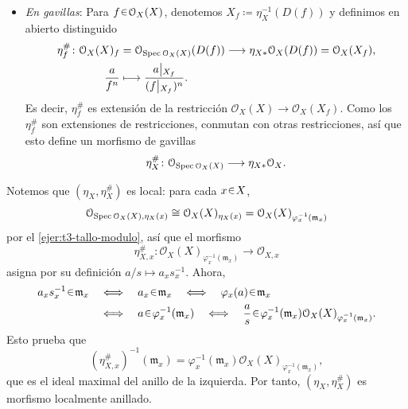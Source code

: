 \begin{sol}
\begin{itemize}
\item \emph{En gavillas}: Para $f\en\mathcal O_X(X)$, denotemos $X_f\coloneq\eta_X^{-1}(D(f))$ y definimos en abierto distinguido
\[
\begin{aligned}
\eta_f^\#\colon\mathcal O_X(X)_f
&=\mathcal O_{\Spec\mathcal O_X(X)}(D(f))
\longrightarrow\eta_{X*}\mathcal O_X(D(f))=\mathcal O_X(X_f),\\
\frac{a}{f^n}&\longmapsto\frac{\restr{a}{X_f}}{(\restr{f}{X_f})^n}.
\end{aligned}
\]
Es decir, $\eta_f^\#$ es extensión de la restricción $\mathcal O_X(X)\to\mathcal O_X(X_f)$. Como los $\eta_f^\#$ son extensiones de restricciones, conmutan con otras restricciones, así que esto define un morfismo de gavillas
\[
\eta_X^\#\colon\mathcal O_{\operatorname{Spec}\mathcal O_X(X)}\longrightarrow\eta_{X*}\mathcal O_X.
\]
\end{itemize}
Notemos que $(\eta_X,\eta_X^\#)$ es local: para cada $x\en X$,
\[
\mathcal O_{\operatorname{Spec}\mathcal O_X(X),\eta_X(x)}
\cong\mathcal O_X(X)_{\eta_X(x)}
=\mathcal O_X(X)_{\varphi_x^{-1}(\mathfrak m_x)}
\]
por el \cref{ejer:t3-tallo-modulo}, así que el morfismo
\[
\eta_{X,x}^\#\colon\mathcal O_X(X)_{\varphi_x^{-1}(\mathfrak m_x)}\longrightarrow\mathcal O_{X,x}
\]
asigna por su definición $a/s\mapsto a_x s_x^{-1}$. Ahora,
\[
\begin{aligned}
a_xs_x^{-1}\en\mathfrak m_x
&\quad\Longleftrightarrow\quad a_x\en\mathfrak m_x
\quad\Longleftrightarrow\quad\varphi_x(a)\en\mathfrak m_x\\
&\quad\Longleftrightarrow\quad a\en\varphi_x^{-1}(\mathfrak m_x)
\quad\Longleftrightarrow\quad
\frac{a}{s}\en\varphi_x^{-1}(\mathfrak m_x)\mathcal O_X(X)_{\varphi_x^{-1}(\mathfrak m_x)}.
\end{aligned}
\]
Esto prueba que
\[
(\eta_{X,x}^\#)^{-1}(\mathfrak m_x)
=\varphi_x^{-1}(\mathfrak m_x)\mathcal O_X(X)_{\varphi_x^{-1}(\mathfrak m_x)},
\]
que es el ideal maximal del anillo de la izquierda. Por tanto, $(\eta_X,\eta_X^\#)$ es morfismo localmente anillado.


\end{sol}
